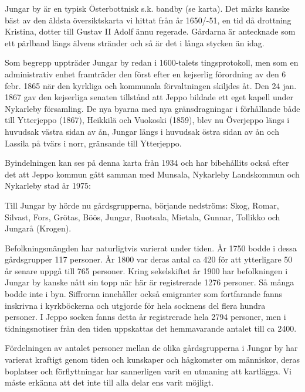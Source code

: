Jungar by är en typisk Österbottnisk s.k. bandby (se karta). Det märks kanske bäst av den äldsta översiktskarta vi hittat från år 1650/-51, en tid då drottning Kristina, dotter till Gustav II Adolf ännu regerade. Gårdarna är antecknade som ett pärlband längs älvens stränder och så är det i långa stycken än idag.


Som begrepp uppträder Jungar by redan i 1600-talets tingsprotokoll, men som en administrativ enhet framträder den först efter en kejserlig förordning av den 6 febr. 1865 när den kyrkliga och kommunala förvaltningen skiljdes åt. Den 24 jan. 1867 gav den kejserliga senaten tillstånd att Jeppo bildade ett eget kapell under Nykarleby församling. De nya byarna med nya gränsdragningar i förhållande både till Ytterjeppo (1867), Heikkilä och Vuokoski (1859), blev nu Överjeppo längs i huvudsak västra sidan av ån, Jungar längs i huvudsak östra sidan av ån och Lassila på tvärs i norr, gränsande till Ytterjeppo.

Byindelningen kan ses på denna karta från 1934 och har bibehållits också efter det att Jeppo kommun gått samman med Munsala, Nykarleby Landskommun och Nykarleby stad år 1975:


Till Jungar by hörde nu gårdsgrupperna, börjande nedströms: Skog, Romar, Silvast, Fors, Grötas, Böös, Jungar, Ruotsala, Mietala, Gunnar, Tollikko och Jungarå (Krogen).

Befolkningsmängden har naturligtvis varierat under tiden. År 1750 bodde i dessa gårdsgrupper 117 personer. År 1800 var deras antal ca 420 för att ytterligare 50 år senare uppgå till 765 personer. Kring sekelskiftet år 1900 har befolkningen i Jungar by kanske nått sin topp när här är registrerade 1276 personer. Så många bodde inte i byn. Siffrorna innehåller också emigranter som fortfarande fanns inskrivna i kyrkböckerna och utgjorde för hela socknens del flera hundra personer. I Jeppo socken fanns detta år registrerade hela 2794 personer, men i tidningsnotiser från den tiden uppskattas det hemmavarande antalet till ca 2400.

Fördelningen av antalet personer mellan de olika gårdsgrupperna i Jungar by har varierat kraftigt genom tiden och kunskaper och hågkomster om människor, deras boplatser och förflyttningar har sannerligen varit en utmaning att kartlägga. Vi måste erkänna att det inte till alla delar ens varit möjligt.

